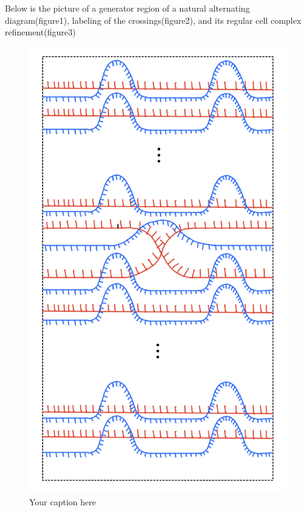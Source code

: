 Below is the picture of a generator region of a natural alternating diagram(figure1), labeling of the crossings(figure2), and its regular cell complex refinement(figure3)
\begin{figure}[H] %
    \centering
    \includegraphics[scale = 0.95]{diagrams/local_systems_on_as_diagrams/1-1.png} %
    \caption{Your caption here}
    \label{fig:your-label}
\end{figure}
